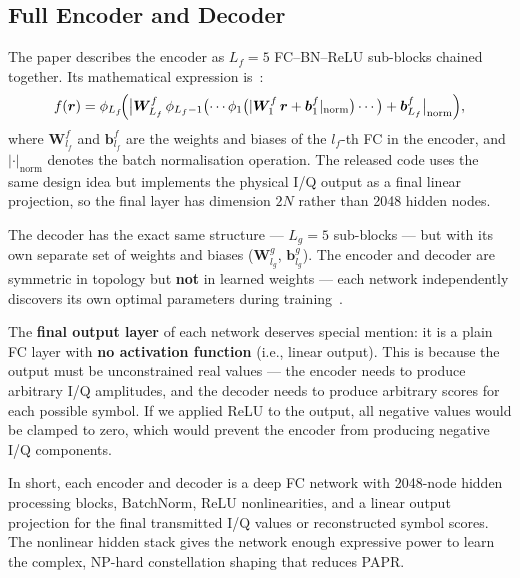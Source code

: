 \subsection{Full Encoder and Decoder}

The paper describes the encoder as $L_f = 5$ FC--BN--ReLU sub-blocks chained
together.  Its mathematical expression is~\cite{kim2017novel}:
\begin{equation}
    f(\bm{r})
    = \phi_{L_f}\!\Bigl(
        \bigl|\bm{W}_{L_f}^f\,
        \phi_{L_f-1}\bigl(\cdots
            \phi_1\bigl(|\bm{W}_1^f\,\bm{r}
                        + \bm{b}_1^f|_{\mathrm{norm}}\bigr)
        \cdots\bigr)
        + \bm{b}_{L_f}^f\bigr|_{\mathrm{norm}}
    \Bigr),
    \label{eq:prnet_encoder_full}
\end{equation}
where $\bm{W}_{l_f}^f$ and $\bm{b}_{l_f}^f$ are the weights and biases
of the $l_f$-th FC in the encoder, and $|\cdot|_{\mathrm{norm}}$ denotes
the batch normalisation operation.  The released code uses the same design
idea but implements the physical I/Q output as a final linear projection, so
the final layer has dimension $2N$ rather than 2048 hidden nodes.

The decoder has the exact same structure --- $L_g = 5$ sub-blocks --- but
with its own separate set of weights and biases
($\bm{W}_{l_g}^g$, $\bm{b}_{l_g}^g$).  The encoder and decoder are
symmetric in topology but \textbf{not} in learned weights --- each network
independently discovers its own optimal parameters during
training~\cite{kim2017novel}.

The \textbf{final output layer} of each network deserves special mention:
it is a plain FC layer with \textbf{no activation function} (i.e., linear
output).  This is because the output must be unconstrained real values ---
the encoder needs to produce arbitrary I/Q amplitudes, and the decoder
needs to produce arbitrary scores for each possible symbol.  If we applied
ReLU to the output, all negative values would be clamped to zero, which
would prevent the encoder from producing negative I/Q components.

In short, each encoder and decoder is a deep FC network with 2048-node hidden
processing blocks, BatchNorm, ReLU nonlinearities, and a linear output
projection for the final transmitted I/Q values or reconstructed symbol
scores.  The nonlinear hidden stack gives the network enough expressive power
to learn the complex, NP-hard constellation shaping that reduces PAPR.


